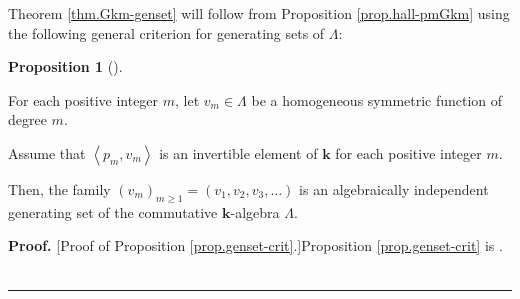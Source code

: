 \documentclass[numbers=enddot,12pt,final,onecolumn,notitlepage]{scrartcl}%
\theoremstyle{definition}
\newtheorem{prop}[theo]{Proposition}
\newenvironment{proposition}[1][]
{\begin{prop}[#1]\begin{leftbar}}
{\end{leftbar}\end{prop}}
\newenvironment{proof}[1][Proof]{\noindent\textbf{#1.} }{\ \rule{0.5em}{0.5em}}
\begin{document}
Theorem \ref{thm.Gkm-genset} will follow from Proposition
\ref{prop.hall-pmGkm} using the following general criterion for generating
sets of $\Lambda$:

\begin{proposition}
\label{prop.genset-crit}For each positive integer $m$, let $v_{m}\in\Lambda$
be a homogeneous symmetric function of degree $m$.

Assume that $\left\langle p_{m},v_{m}\right\rangle $ is an invertible element
of $\mathbf{k}$ for each positive integer $m$.

Then, the family $\left(  v_{m}\right)  _{m\geq1}=\left(  v_{1},v_{2}%
,v_{3},\ldots\right)  $ is an algebraically independent generating set of the
commutative $\mathbf{k}$-algebra $\Lambda$.
\end{proposition}

\begin{proof}
[Proof of Proposition \ref{prop.genset-crit}.]Proposition
\ref{prop.genset-crit} is \cite[Exercise 2.5.24]{GriRei}.
\end{proof}
\end{document}
